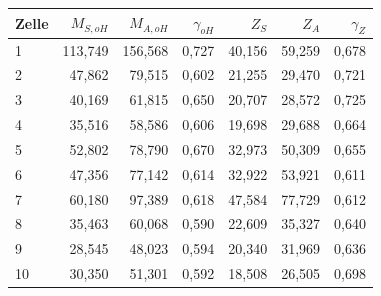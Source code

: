 \begin{center}
    \centering
    \begin{tabular}{lrrrrrr}
        \toprule
        Zelle &  $M_{S,oH}$ &  $M_{A,oH}$ &  $\gamma_{oH}$ &   $Z_S$ &   $Z_A$ &  $\gamma_Z$ \\
        \midrule
        1     & 113,749 & 156,568 &     0,727 & 40,156 & 59,259 &    0,678 \\
        2     &  47,862 &  79,515 &     0,602 & 21,255 & 29,470 &    0,721 \\
        3     &  40,169 &  61,815 &     0,650 & 20,707 & 28,572 &    0,725 \\
        4     &  35,516 &  58,586 &     0,606 & 19,698 & 29,688 &    0,664 \\
        5     &  52,802 &  78,790 &     0,670 & 32,973 & 50,309 &    0,655 \\
        6     &  47,356 &  77,142 &     0,614 & 32,922 & 53,921 &    0,611 \\
        7     &  60,180 &  97,389 &     0,618 & 47,584 & 77,729 &    0,612 \\
        8     &  35,463 &  60,068 &     0,590 & 22,609 & 35,327 &    0,640 \\
        9     &  28,545 &  48,023 &     0,594 & 20,340 & 31,969 &    0,636 \\
        10    &  30,350 &  51,301 &     0,592 & 18,508 & 26,505 &    0,698 \\
        \bottomrule
    \end{tabular}
    \label{tab:YFP2}
\end{center}

